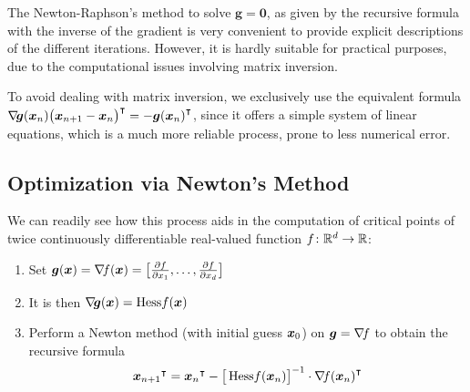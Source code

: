 \begin{remark}
The Newton-Raphson's method to solve $\boldsymbol{g}=\boldsymbol{0}$, as given by the recursive formula with the inverse of the gradient is very convenient to provide explicit descriptions of the different iterations.  However, it is hardly suitable for practical purposes, due to the computational issues involving matrix inversion.

To avoid dealing with matrix inversion, we exclusively use the equivalent formula $\mathop{\nabla\! {\boldsymbol{g}}}(\boldsymbol{x}_n) {\big( \boldsymbol{x}_{n+1} - \boldsymbol{x}_n \big)}^\intercal = -{\boldsymbol{g}(\boldsymbol{x}_n)}^\intercal$, since it offers a simple system of linear equations, which is a much more reliable process, prone to less numerical error.
\end{remark}

\subsection{Optimization via Newton's Method}
We can readily see how this process aids in the computation of critical points of twice continuously differentiable real-valued function $f\colon \mathbb{R}^d \to \mathbb{R}$:
\begin{enumerate}
	\item Set $\boldsymbol{g}(\boldsymbol{x}) = \mathop{\nabla\! {f}}(\boldsymbol{x}) = \big[ \frac{\partial f}{\partial x_1}, \dotsc, \frac{\partial f}{\partial x_d} \big]$
	\item It is then $\mathop{\nabla\! {\boldsymbol{g}}}(\boldsymbol{x}) = \mathop{\mathrm{Hess}{f}}(\boldsymbol{x})$
	\item Perform a Newton method (with initial guess $\boldsymbol{x}_0$) on $\boldsymbol{g}=\mathop{\nabla\! {f}}$ to obtain the recursive formula
	\begin{equation}\label{equation:Newton4Crit}
	{\boldsymbol{x}_{n+1}}^\intercal = {\boldsymbol{x}_n}^\intercal - \big[ \mathop{\mathrm{Hess}{f}}(\boldsymbol{x}_n) \big]^{-1} \cdot {\mathop{\nabla\! {f}}(\boldsymbol{x}_n)}^\intercal
	\end{equation}
\end{enumerate}


